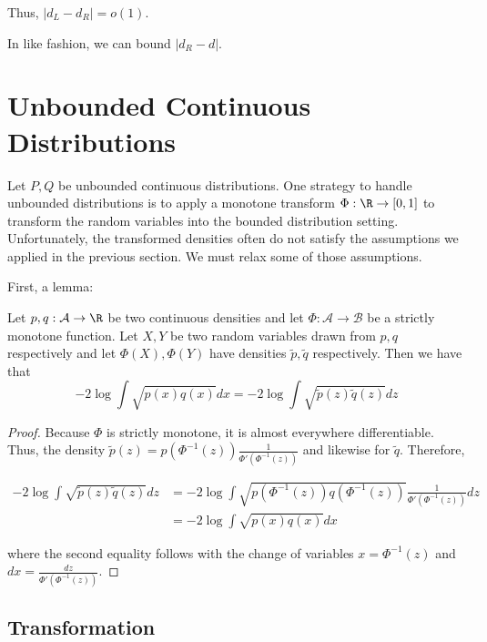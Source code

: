 \documentclass{article}
\begin{document}
Thus, $|d_L - d_R| = o(1)$. 

In like fashion, we can bound $| d_R - d|$. 



\newpage
\section{Unbounded Continuous Distributions}



Let $P, Q$ be unbounded continuous distributions. One strategy to handle unbounded distributions is to apply a monotone transform $\Phi: \R \rightarrow [0,1]$ to transform the random variables into the bounded distribution setting. Unfortunately, the transformed densities often do not satisfy the assumptions we applied in the previous section. We must relax some of those assumptions.

First, a lemma:
\begin{lemma}
Let $p, q : \mathcal{A} \rightarrow \R$ be two continuous densities and let $\Phi : \mathcal{A} \rightarrow \mathcal{B}$ be a strictly monotone function. Let $X, Y$ be two random variables drawn from $p,q$ respectively and let $\Phi(X), \Phi(Y)$ have densities $\tilde{p}, \tilde{q}$ respectively. Then we have that
\[
-2 \log \int \sqrt{p(x)q(x)} dx = -2 \log \int \sqrt{ \tilde{p}(z) \tilde{q}(z)} dz
\]
\end{lemma}

\begin{proof}
Because $\Phi$ is strictly monotone, it is almost everywhere differentiable. Thus, the density $\tilde{p}(z) = p(\Phi^{-1}(z)) \frac{1}{\Phi'(\Phi^{-1}(z))}$ and likewise for $\tilde{q}$. Therefore,

\begin{align*}
 -2 \log \int \sqrt{ \tilde{p}(z) \tilde{q}(z)} dz &=
    -2 \log \int \sqrt{ p(\Phi^{-1}(z)) q(\Phi^{-1}(z)) } \frac{1}{\Phi'(\Phi^{-1}(z))} dz \\
 &= -2 \log \int \sqrt{ p(x) q(x)} dx
\end{align*}

where the second equality follows with the change of variables $x = \Phi^{-1}(z)$ and 
$dx = \frac{dz}{\Phi'(\Phi^{-1}(z))}$. 
\end{proof}


\subsection{Transformation}
\end{document}
